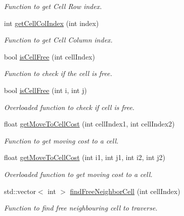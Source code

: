 \begin{DoxyCompactItemize}
\begin{DoxyCompactList}\small\item\em Function to get Cell Row index. \end{DoxyCompactList}\item 
int \hyperlink{classastar__plugin_1_1_a_star_planner_a7242cadadc720feb8af97bc9f427f53c}{get\+Cell\+Col\+Index} (int index)
\begin{DoxyCompactList}\small\item\em Function to get Cell Column index. \end{DoxyCompactList}\item 
bool \hyperlink{classastar__plugin_1_1_a_star_planner_a29d81e8f4ac6191296d5c180be9ac8ae}{is\+Cell\+Free} (int cell\+Index)
\begin{DoxyCompactList}\small\item\em Function to check if the cell is free. \end{DoxyCompactList}\item 
bool \hyperlink{classastar__plugin_1_1_a_star_planner_ae8f5105e002f679874c3d55815fe30ad}{is\+Cell\+Free} (int i, int j)
\begin{DoxyCompactList}\small\item\em Overloaded function to check if cell is free. \end{DoxyCompactList}\item 
float \hyperlink{classastar__plugin_1_1_a_star_planner_ad07f32fd3a1e44ef3bb9bb1e59237023}{get\+Move\+To\+Cell\+Cost} (int cell\+Index1, int cell\+Index2)
\begin{DoxyCompactList}\small\item\em Function to get moving cost to a cell. \end{DoxyCompactList}\item 
float \hyperlink{classastar__plugin_1_1_a_star_planner_a2f19049be7428c445b7159cc111b4401}{get\+Move\+To\+Cell\+Cost} (int i1, int j1, int i2, int j2)
\begin{DoxyCompactList}\small\item\em Overloaded function to get moving cost to a cell. \end{DoxyCompactList}\item 
std\+::vector$<$ int $>$ \hyperlink{classastar__plugin_1_1_a_star_planner_a5ea485f93bfba47034d611b04eba2189}{find\+Free\+Neighbor\+Cell} (int cell\+Index)
\begin{DoxyCompactList}\small\item\em Function to find free neighbouring cell to traverse. \end{DoxyCompactList}\item 

\end{DoxyCompactItemize}
